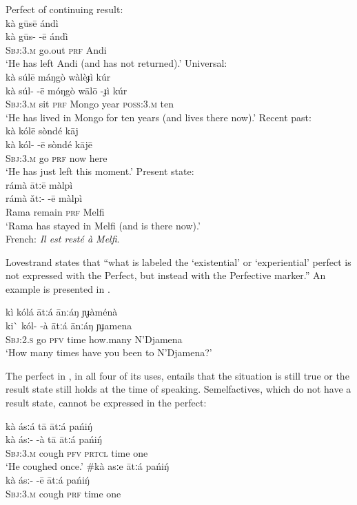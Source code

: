 \ea \label{ex:22.25}
\ea  Perfect of continuing result:\\
\glll kà  gūsē  {}  ándì\\
kà  gūs-  -ē  ándì\\
\textsc{Sbj:3.m}  go.out  \textsc{prf}  Andi\\
\glt ‘He has left Andi (and has not returned).’
\ex   Universal:\\
\glll kà  súlē  {}  máŋgò  wàlèɟì  {}  kúr\\
kà  súl-  -ē  móŋgò  wālō  -ɟì   kúr\\
\textsc{Sbj:3.m}  sit  \textsc{prf}  Mongo  year  \textsc{poss:3.m}  ten\\
\glt ‘He has lived in Mongo for ten years (and lives there now).’
\ex   Recent past:\\
\glll kà  kólē  {}  sòndé  kāj\\
kà  kól-  -ē  sòndé  kājē\\
\textsc{Sbj:3.m}  go  \textsc{prf}  now  here\\
\glt ‘He has just left this moment.’
\ex   Present state:\\
\glll rámà  ātːē  {}  màlpì\\
rámà  ǎtː-  -ē  màlpì\\
Rama  remain  \textsc{prf}  Melfi\\
\glt ‘Rama has stayed in Melfi (and is there now).’\\
{French}: \textit{Il est resté à Melfi}.
\z \z


Lovestrand states that “what is labeled the ‘existential’ or ‘experiential’ perfect is not expressed with the Perfect, but instead with the Perfective marker.” An example is presented in .


\ea \label{ex:22.26}
\glll kì  kólá  {}  ātːá  ānːáŋ  ɲɟàménà\\
ki\`{}   kól-  -à  ātːá  ānːáŋ  ɲɟamena\\
\textsc{Sbj:2.s}  go  \textsc{pfv}  time  how.many  N’Djamena\\
\glt ‘How many times have you been to N’Djamena?’
\z


The perfect in , in all four of its uses, entails that the situation is still true or the result state still holds at the time of speaking. Semelfactives, which do not have a result state, cannot be expressed in the perfect:


\ea \label{ex:22.27}
\ea \glll  kà  ásːá  {}  tā  ātːá  pańiŋ́ \\
kà  ásː-  -à  tā  ātːá  pańiŋ́ \\
\textsc{Sbj:3.m}  cough  \textsc{pfv}  \textsc{prtcl}  time  one\\
\glt ‘He coughed once.’
\ex \glll  \#kà  asːe  {}  ātːá  pańiŋ́ \\ 
  kà  ásː-  -ē  ātːá  pańiŋ́ \\
\textsc{Sbj:3.m}  cough  \textsc{prf}  time  one\\
\z \z


